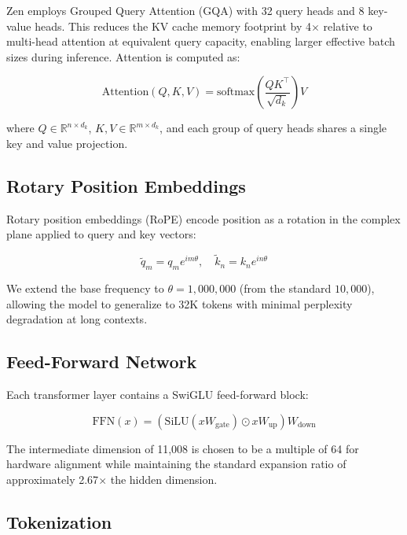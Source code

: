 \documentclass[11pt,a4paper]{article}
\begin{document}
Zen employs Grouped Query Attention (GQA) \cite{ainslie2023gqa} with 32 query heads and 8
key-value heads. This reduces the KV cache memory footprint by 4$\times$ relative to multi-head
attention at equivalent query capacity, enabling larger effective batch sizes during inference.
Attention is computed as:

\begin{equation}
  \text{Attention}(Q, K, V) = \text{softmax}\!\left(\frac{QK^\top}{\sqrt{d_k}}\right)V
\end{equation}

where $Q \in \mathbb{R}^{n \times d_k}$, $K, V \in \mathbb{R}^{m \times d_k}$, and each group
of query heads shares a single key and value projection.

\subsection{Rotary Position Embeddings}

Rotary position embeddings (RoPE) \cite{su2021rope} encode position as a rotation in the complex
plane applied to query and key vectors:

\begin{equation}
  \tilde{q}_m = q_m e^{im\theta}, \quad \tilde{k}_n = k_n e^{in\theta}
\end{equation}

We extend the base frequency to $\theta = 1{,}000{,}000$ (from the standard $10{,}000$), allowing
the model to generalize to 32K tokens with minimal perplexity degradation at long contexts.

\subsection{Feed-Forward Network}

Each transformer layer contains a SwiGLU \cite{shazeer2020glu} feed-forward block:

\begin{equation}
  \text{FFN}(x) = \left(\text{SiLU}(xW_{\text{gate}}) \odot xW_{\text{up}}\right) W_{\text{down}}
\end{equation}

The intermediate dimension of 11,008 is chosen to be a multiple of 64 for hardware alignment
while maintaining the standard expansion ratio of approximately 2.67$\times$ the hidden dimension.

\subsection{Tokenization}
\end{document}
